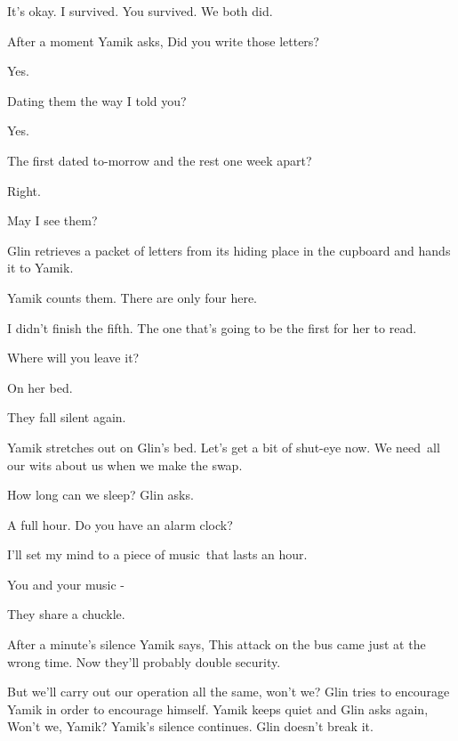 \documentclass[twoside,11pt]{book}
\begin{document}
{\textquotedbl}It's okay. I survived. You survived. We both did.{\textquotedbl}

After a moment Yamik asks, {\textquotedbl}Did you write those letters?{\textquotedbl} 

{\textquotedbl}Yes.{\textquotedbl} 

{\textquotedbl}Dating them the way I told you?{\textquotedbl} 

{\textquotedbl}Yes.{\textquotedbl} 

{\textquotedbl}The first dated to-morrow and the rest one week apart?{\textquotedbl} 

{\textquotedbl}Right.{\textquotedbl} 

{\textquotedbl}May I see them?{\textquotedbl} 

Glin retrieves a packet of letters from its hiding place in the cupboard and hands it to Yamik. 

Yamik counts them. {\textquotedbl}There are only four here.{\textquotedbl} 

{\textquotedbl}I didn't finish the fifth. The one that's going to be the first for her to read.{\textquotedbl} 

{\textquotedbl}Where will you leave it?{\textquotedbl} 

{\textquotedbl}On her bed.{\textquotedbl}

They fall silent again.

Yamik stretches out on Glin's bed. {\textquotedbl}Let's get a bit of shut-eye now. We need~all our wits about us when we
make the swap. {\textquotedbl} 

{\textquotedbl}How long can we sleep?{\textquotedbl} Glin asks. 

{\textquotedbl}A full hour. Do you have an alarm clock?{\textquotedbl} 

{\textquotedbl}I'll set my mind to a piece of music~that lasts an hour.{\textquotedbl} 

{\textquotedbl}You and your music -{\textquotedbl}

They share a chuckle.\ 

After a minute's silence Yamik says, {\textquotedbl}This attack on the bus came just at the wrong time. Now they'll
probably double security.{\textquotedbl} 

{\textquotedbl}But we'll carry out our operation all the same, won't we?{\textquotedbl} Glin tries to encourage Yamik in
order to encourage himself. Yamik keeps quiet and Glin asks again, {\textquotedbl}Won't we, Yamik?{\textquotedbl}
Yamik's silence continues. Glin doesn't break it.
\end{document}
